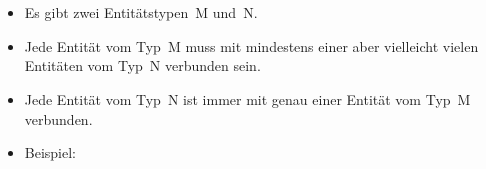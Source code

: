 %
\section{}%
%
\begin{frame}[t]%
\frametitle{}%
\begin{itemize}%
\item Es gibt zwei Entitätstypen~M und~N.%
\item<2-> Jede Entität vom Typ~M muss mit mindestens einer aber vielleicht vielen Entitäten vom Typ~N verbunden sein.%
\item<3-> Jede Entität vom Typ~N ist immer mit genau einer Entität vom Typ~M verbunden.
\item<4-> Beispiel:%
\end{itemize}%
%
%
\end{frame}%
%
